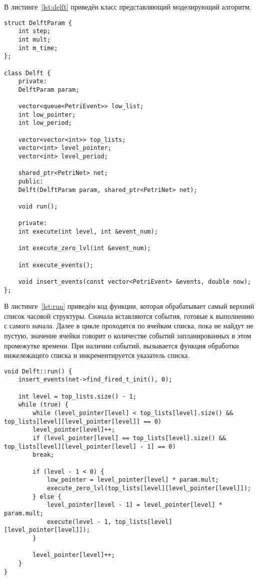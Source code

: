 В листинге~\ref{lst:delft} приведён класс представляющий моделирующий алгоритм.

\begin{center}
	\captionsetup{justification=raggedright,singlelinecheck=off}
	\begin{lstlisting}[label=lst:delft,caption=Класс моделирующего алгоритма ,showstringspaces=false]
struct DelftParam {
	int step;
	int mult;
	int m_time;
};

class Delft {
	private:
	DelftParam param;
	
	vector<queue<PetriEvent>> low_list;
	int low_pointer;
	int low_period;
	
	vector<vector<int>> top_lists;
	vector<int> level_pointer;
	vector<int> level_period;
	
	shared_ptr<PetriNet> net;
	public:
	Delft(DelftParam param, shared_ptr<PetriNet> net);
	
	void run();
	
	private:
	int execute(int level, int &event_num);
	
	int execute_zero_lvl(int &event_num);
	
	int execute_events();
	
	void insert_events(const vector<PetriEvent> &events, double now);
};		
	\end{lstlisting}
\end{center}
\FloatBarrier

В листинге~\ref{lst:run} приведён код функции, которая обрабатывает самый верхний список часовой структуры. Сначала вставляются события, готовые к выполнению с самого начала. Далее в цикле проходятся по ячейкам списка, пока не найдут не пустую, значение ячейки говорит о количестве событий запланированных в этом промежутке времени. При наличии событий, вызывается функция обработки нижележащего списка и инкрементируется указатель списка.

\begin{center}
	\captionsetup{justification=raggedright,singlelinecheck=off}
	\begin{lstlisting}[label=lst:run,caption=Функция обработки верхнего списка,showstringspaces=false]
void Delft::run() {
	insert_events(net->find_fired_t_init(), 0);
	
	int level = top_lists.size() - 1;
	while (true) {
		while (level_pointer[level] < top_lists[level].size() && top_lists[level][level_pointer[level]] == 0)
		level_pointer[level]++;
		if (level_pointer[level] == top_lists[level].size() && top_lists[level][level_pointer[level] - 1] == 0)
		break;
		
		if (level - 1 < 0) {
			low_pointer = level_pointer[level] * param.mult;
			execute_zero_lvl(top_lists[level][level_pointer[level]]);
		} else {
			level_pointer[level - 1] = level_pointer[level] * param.mult;
			execute(level - 1, top_lists[level][level_pointer[level]]);
		}
		
		level_pointer[level]++;
	}
}	
	\end{lstlisting}
\end{center}
\FloatBarrier


